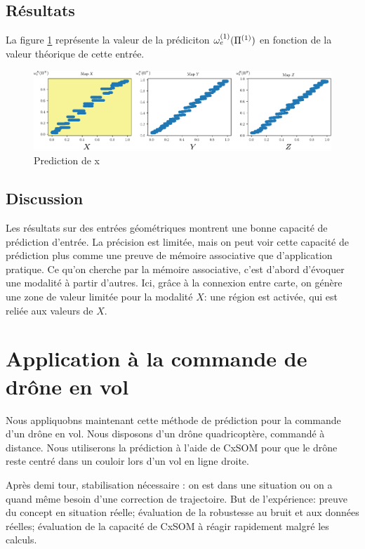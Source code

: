 \subsection{Résultats}

La figure \ref{fig:pred} représente la valeur de la prédiciton $\omega_{e}^{({1})}(\Pi^{({1})})$ en fonction de la valeur théorique de cette entrée. 
\begin{figure}
\centering
\includegraphics[width=\textwidth]{prediction_x2}
\caption{Prediction de x}
\label{fig:pred}
\end{figure}


\subsection{Discussion}
Les résultats sur des entrées géométriques montrent une bonne capacité de prédiction d'entrée.
La précision est limitée, mais on peut voir cette capacité de prédiction plus comme une preuve de mémoire associative que d'application pratique.
Ce qu'on cherche par la mémoire associative, c'est d'abord d'évoquer une modalité à partir d'autres. Ici, grâce à la connexion entre carte, on génère une zone de valeur limitée pour la modalité $X$: une région est activée, qui est reliée aux valeurs de $X$.

\section{Application à la commande de drône en vol}

Nous appliquobns maintenant cette méthode de prédiction pour la commande d'un drône en vol. Nous disposons d'un drône quadricoptère, commandé à distance. Nous utiliserons la prédiction à l'aide de CxSOM pour que le drône reste centré dans un couloir lors d'un vol en ligne droite. 

Après demi tour, stabilisation nécessaire : on est dans une situation ou on a quand même besoin d'une correction de trajectoire.
But de l'expérience: preuve du concept en situation réelle; évaluation de la robustesse au bruit et aux données réelles; évaluation de la capacité de CxSOM à réagir rapidement malgré les calculs.

